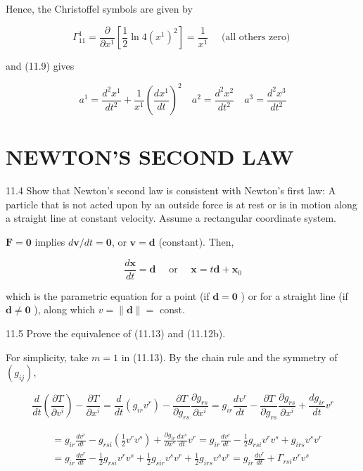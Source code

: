 \documentclass[10pt]{article}
\begin{document}
Hence, the Christoffel symbols are given by

$$
\Gamma_{11}^{1}=\frac{\partial}{\partial x^{1}}\left[\frac{1}{2} \ln 4\left(x^{1}\right)^{2}\right]=\frac{1}{x^{1}} \quad \text { (all others zero) }
$$

and (11.9) gives

$$
a^{1}=\frac{d^{2} x^{1}}{d t^{2}}+\frac{1}{x^{1}}\left(\frac{d x^{1}}{d t}\right)^{2} \quad a^{2}=\frac{d^{2} x^{2}}{d t^{2}} \quad a^{3}=\frac{d^{2} x^{3}}{d t^{2}}
$$

\section*{NEWTON'S SECOND LAW}
11.4 Show that Newton's second law is consistent with Newton's first law: A particle that is not acted upon by an outside force is at rest or is in motion along a straight line at constant velocity. Assume a rectangular coordinate system.

$\mathbf{F}=\mathbf{0}$ implies $d \mathbf{v} / d t=\mathbf{0}$, or $\mathbf{v}=\mathbf{d}$ (constant). Then,

$$
\frac{d \mathbf{x}}{d t}=\mathbf{d} \quad \text { or } \quad \mathbf{x}=t \mathbf{d}+\mathbf{x}_{0}
$$

which is the parametric equation for a point (if $\mathbf{d}=\mathbf{0}$ ) or for a straight line (if $\mathbf{d} \neq \mathbf{0}$ ), along which $v=\|\mathbf{d}\|=$ const.

11.5 Prove the equivalence of (11.13) and (11.12b).

For simplicity, take $m=1$ in (11.13). By the chain rule and the symmetry of $\left(g_{i j}\right)$,

$$
\frac{d}{d t}\left(\frac{\partial T}{\partial v^{i}}\right)-\frac{\partial T}{\partial x^{i}}=\frac{d}{d t}\left(g_{i r} v^{r}\right)-\frac{\partial T}{\partial g_{r s}} \frac{\partial g_{r s}}{\partial x^{i}}=g_{i r} \frac{d v^{r}}{d t}-\frac{\partial T}{\partial g_{r s}} \frac{\partial g_{r s}}{\partial x^{i}}+\frac{d g_{i r}}{d t} v^{r}
$$

$$
\begin{aligned}
& =g_{i r} \frac{d v^{r}}{d t}-g_{r s i}\left(\frac{1}{2} v^{r} v^{s}\right)+\frac{\partial g_{i r}}{\partial x^{s}} \frac{d x^{s}}{d t} v^{r}=g_{i r} \frac{d v^{r}}{d t}-\frac{1}{2} g_{r s i} v^{r} v^{s}+g_{i r s} v^{s} v^{r} \\
& =g_{i r} \frac{d v^{r}}{d t}-\frac{1}{2} g_{r s i} v^{r} v^{s}+\frac{1}{2} g_{s i r} v^{s} v^{r}+\frac{1}{2} g_{i r s} v^{s} v^{r}=g_{i r} \frac{d v^{r}}{d t}+\Gamma_{r s i} v^{r} v^{s}
\end{aligned}
$$
\end{document}
